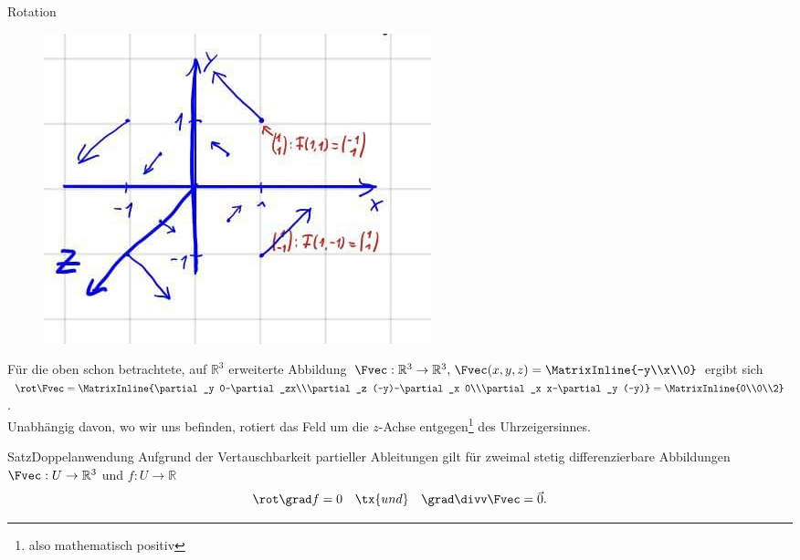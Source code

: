 \begin{Beispiel}
{Rotation}
\begin{figure}
 \vspace{-15pt}
\includegraphics[width=.25\textwidth]{Dateien/07/07Rotation.jpg}
 \vspace{-15pt}
\end{figure}
Für die oben schon betrachtete, auf $\mathbb{R}^3$ erweiterte Abbildung $\Fvec:\mathbb{R}^3\to\mathbb{R}^3,\,\Fvec(x,y,z)=\MatrixInline{-y\\x\\0}$ ergibt sich $\rot \Fvec=\MatrixInline{\partial_y 0-\partial_zx\\\partial_z (-y)-\partial_x 0\\\partial_x x-\partial_y (-y)}=\MatrixInline{0\\0\\2}$.\\
Unabhängig davon, wo wir uns befinden, rotiert das Feld um die $z$-Achse entgegen\footnote{also mathematisch positiv} des Uhrzeigersinnes.
\end{Beispiel}

\begin{Satz}
{Satz}{Doppelanwendung}
Aufgrund der Vertauschbarkeit partieller Ableitungen gilt für zweimal stetig differenzierbare Abbildungen $\Fvec:U\to\mathbb{R}^3$ und $f:U\to\mathbb{R}$ 
\begin{equation}
    \rot\grad f=0\quad \tx{und} \quad \grad \divv \Fvec=\Vec{0}.
\end{equation}
\end{Satz}

